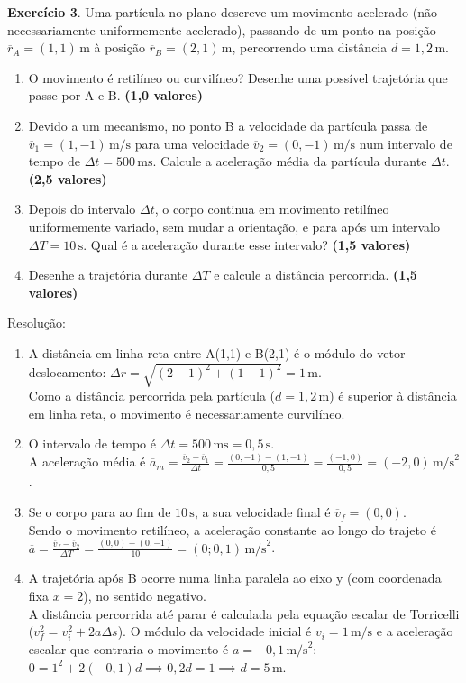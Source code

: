 \documentclass[12pt]{article}
\newcommand{\pontos}[1]{\hfill\textbf{(#1 valores)}}
\begin{document}
	\textbf{Exercício 3}. Uma partícula no plano descreve um movimento acelerado (não necessariamente uniformemente acelerado), passando de um ponto na posição $\overline{r}_A = (1,1)\,\text{m}$ à posição $\overline{r}_B = (2,1)\,\text{m}$, percorrendo uma distância $d = 1,2\,\text{m}$.
	\begin{enumerate}[label=\alph*)]
		\item O movimento é retilíneo ou curvilíneo? Desenhe uma possível trajetória que passe por A e B. \pontos{1,0}
		\item Devido a um mecanismo, no ponto B a velocidade da partícula passa de $\overline{v}_1 = (1,-1)\,\text{m/s}$ para uma velocidade $\overline{v}_2 = (0,-1)\,\text{m/s}$ num intervalo de tempo de $\Delta t = 500\,\text{ms}$. Calcule a aceleração média da partícula durante $\Delta t$. \pontos{2,5}
		\item Depois do intervalo $\Delta t$, o corpo continua em movimento retilíneo uniformemente variado, sem mudar a orientação, e para após um intervalo $\Delta T = 10\,\text{s}$. Qual é a aceleração durante esse intervalo? \pontos{1,5}
		\item Desenhe a trajetória durante $\Delta T$ e calcule a distância percorrida. \pontos{1,5}
	\end{enumerate}
	
	\vspace{0.4cm}
	Resolução:
	\begin{enumerate}[label=\alph*), itemsep=12pt]
		\item A distância em linha reta entre A(1,1) e B(2,1) é o módulo do vetor deslocamento: $\Delta r = \sqrt{(2-1)^2 + (1-1)^2} = 1\,\text{m}$. \\
		Como a distância percorrida pela partícula ($d = 1,2\,\text{m}$) é superior à distância em linha reta, o movimento é necessariamente curvilíneo.
		
		\item O intervalo de tempo é $\Delta t = 500\,\text{ms} = 0,5\,\text{s}$. \\
		A aceleração média é $\overline{a}_m = \frac{\overline{v}_2 - \overline{v}_1}{\Delta t} = \frac{(0, -1) - (1, -1)}{0,5} = \frac{(-1, 0)}{0,5} = (-2, 0)\,\text{m/s}^2$.
		
		\item Se o corpo para ao fim de $10\,\text{s}$, a sua velocidade final é $\overline{v}_f = (0,0)$. \\
		Sendo o movimento retilíneo, a aceleração constante ao longo do trajeto é $\overline{a} = \frac{\overline{v}_f - \overline{v}_2}{\Delta T} = \frac{(0,0) - (0,-1)}{10} = (0; 0,1)\,\text{m/s}^2$.
		
		\item A trajetória após B ocorre numa linha paralela ao eixo y (com coordenada fixa $x=2$), no sentido negativo. \\
		A distância percorrida até parar é calculada pela equação escalar de Torricelli ($v_f^2 = v_i^2 + 2a\Delta s$). O módulo da velocidade inicial é $v_i = 1\,\text{m/s}$ e a aceleração escalar que contraria o movimento é $a = -0,1\,\text{m/s}^2$: \\
		$0 = 1^2 + 2(-0,1)d \implies 0,2d = 1 \implies d = 5\,\text{m}$.
	\end{enumerate}
	
\end{document}
